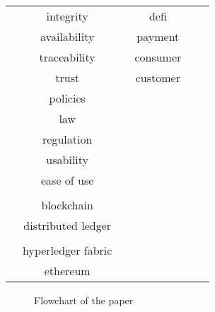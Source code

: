 \begin{table}[H]
\begin{tabular}{|c|c|c|c|c|c|}
\cellcolor{gray!15}& integrity & \cellcolor{gray!15}& defi         & \cellcolor{gray!15}&  \\
\cellcolor{gray!15}& availability & \cellcolor{gray!15}& payment         & \cellcolor{gray!15}&  \\ 
\cellcolor{gray!15}& traceability & \cellcolor{gray!15}& consumer         & \cellcolor{gray!15}&  \\ 
\cellcolor{gray!15}& trust & \cellcolor{gray!15}& customer         & \cellcolor{gray!15}&  \\ 
\cellcolor{gray!15}& policies & \cellcolor{gray!15}&          & \cellcolor{gray!15}&  \\ 
\cellcolor{gray!15}& law & \cellcolor{gray!15}&          & \cellcolor{gray!15}&  \\ 
\cellcolor{gray!15}& regulation & \cellcolor{gray!15}&          & \cellcolor{gray!15}&  \\ 
\cellcolor{gray!15}& usability & \cellcolor{gray!15}&          & \cellcolor{gray!15}&  \\ 
\cellcolor{gray!15}& ease of use & \cellcolor{gray!15}&          & \cellcolor{gray!15}&  \\ 
\cellcolor{gray!15}&  & \cellcolor{gray!15}&          & \cellcolor{gray!15}&  \\ 
\cellcolor{gray!15}& blockchain & \cellcolor{gray!15}&          & \cellcolor{gray!15}&  \\ 
\cellcolor{gray!15}& distributed ledger & \cellcolor{gray!15}&          & \cellcolor{gray!15}& \\
\cellcolor{gray!15}&  & \cellcolor{gray!15}&          & \cellcolor{gray!15}&  \\ 
\cellcolor{gray!15}& hyperledger fabric & \cellcolor{gray!15}&          & \cellcolor{gray!15}&  \\ 
\cellcolor{gray!15}& ethereum & \cellcolor{gray!15}&          & \cellcolor{gray!15}& \\[0.3em]\hline
\end{tabular}

    
    \label{tab:searchstrings}
\end{table}

\begin{landscape}
\begin{figure}[H]
    \centering
    
    \caption{Flowchart of the paper}
    \label{fig:flowchart}
\end{figure}
\end{landscape}